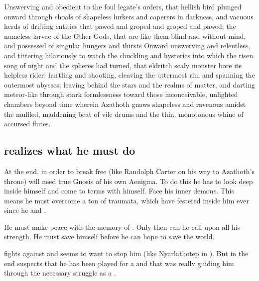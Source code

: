 {  Unswerving and obedient to the foul legate's orders, that hellish bird plunged onward through shoals of shapeless lurkers and caperers in darkness, and vacuous herds of drifting entities that pawed and groped and groped and pawed; the nameless larvae of the Other Gods, that are like them blind and without mind, and possessed of singular hungers and thirsts
  Onward unswerving and relentless, and tittering hilariously to watch the chuckling and hysterics into which the risen song of night and the spheres had turned, that eldritch scaly monster bore its helpless rider; hurtling and shooting, cleaving the uttermost rim and spanning the outermost abysses; leaving behind the stars and the realms of matter, and darting meteor-like through stark formlessness toward those inconceivable, unlighted chambers beyond time wherein Azathoth gnaws shapeless and ravenous amidst the muffled, maddening beat of vile drums and the thin, monotonous whine of accursed flutes.
}







\subsection{\Ishnaruchaefir realizes what he must do}
At the end, in order to break free (like Randolph Carter on his way to Azathoth's throne) \Ishnaruchaefir will need true Gnosis of his own Aenigma. 
To do this he has to look deep inside himself and come to terms with himself. 
Face his inner demons. 
This means he must overcome a ton of traumata, which have festered inside him ever since he  and . 

He must make peace with the memory of \Rystessakhin{}. 
Only then can he call upon all his strength. 
He must save himself before he can hope to save the world. 

\Achamoth fights against \Ishnaruchaefir and seems to want to stop him (like Nyarlathotep in \cite{HPLovecraft:TheDreamQuestofUnknownKadath}).
But in the end \Ishnaruchaefir suspects that he has been played for a  and that \Achamoth was really guiding him through the necessary struggle as a . 


